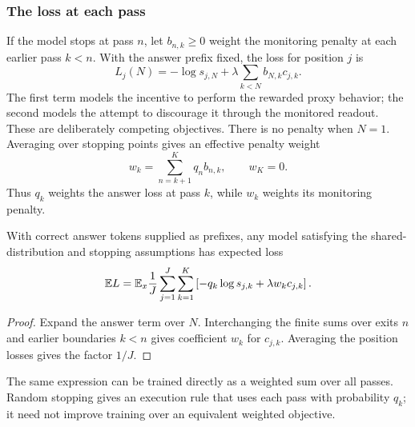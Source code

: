 \subsubsection{The loss at each pass}
If the model stops at pass $n$, let $b_{n,k}\ge0$ weight the monitoring penalty at each earlier pass $k<n$. With the answer prefix fixed, the loss for position $j$ is
\begin{equation}
 L_j(N)=-\log s_{j,N}+\lambda\sum_{k<N}b_{N,k}c_{j,k}.
 \label{eq:sampleloss}
\end{equation}
The first term models the incentive to perform the rewarded proxy behavior; the second models the attempt to discourage it through the monitored readout. These are deliberately competing objectives. There is no penalty when $N=1$. Averaging over stopping points gives an effective penalty weight
\begin{equation}
 w_k=\sum_{n=k+1}^{K}q_n b_{n,k},\qquad w_K=0.
 \label{eq:generalw}
\end{equation}
Thus $q_k$ weights the answer loss at pass $k$, while $w_k$ weights its monitoring penalty.

\begin{proposition}
With correct answer tokens supplied as prefixes, any model satisfying the shared-distribution and stopping assumptions has expected loss
\begin{equation}
 \mathbb E L=\mathbb E_x\frac{1}{J}\sum_{j=1}^{J}\sum_{k=1}^{K}
 \left[-q_k\log s_{j,k}+\lambda w_k c_{j,k}\right].
 \label{eq:expected-full}
\end{equation}
\end{proposition}
\begin{proof}
Expand the answer term over $N$. Interchanging the finite sums over exits $n$ and earlier boundaries $k<n$ gives coefficient $w_k$ for $c_{j,k}$. Averaging the position losses gives the factor $1/J$.
\end{proof}
The same expression can be trained directly as a weighted sum over all passes. Random stopping gives an execution rule that uses each pass with probability $q_k$; it need not improve training over an equivalent weighted objective.

